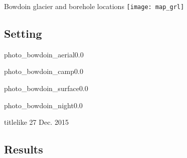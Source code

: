     \begin{frame}{Bowdoin glacier and borehole locations}
      \centering
      \texttt{[image: map\_grl]}
    \end{frame}


\subsection{Setting}

    \begin{backgroundframe}{photo_bowdoin_aerial}{0.0}{}
    \end{backgroundframe}

    \begin{backgroundframe}{photo_bowdoin_camp}{0.0}{}
    \end{backgroundframe}

    \begin{backgroundframe}{photo_bowdoin_surface}{0.0}{}
    \end{backgroundframe}

    \begin{backgroundframe}{photo_bowdoin_night}{0.0}{}
      \vspace{6cm}\hfill
      \begin{beamercolorbox}[sep=1em,wd=30mm]{titlelike}
        27 Dec. 2015
      \end{beamercolorbox}
    \end{backgroundframe}

\subsection{Results}

